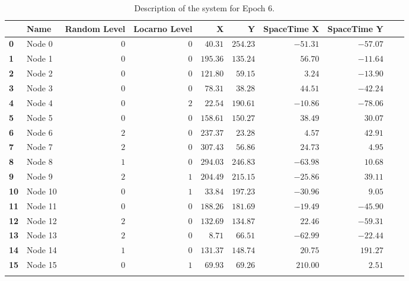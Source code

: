 \documentclass[a4paper,11pt,twoside=semi,openright]{report}
\begin{document}
\begin{table}[h]
\centering
\tiny
\begin{tabular}{@{}llrrrrrrll@{}}
\toprule
& \textbf{Name}   &\textbf{Random Level} &\textbf{Locarno Level} & \textbf{X} & \textbf{Y} & \textbf{SpaceTime X} & \textbf{SpaceTime Y}  \\ \midrule
\textbf{0} & Node 0&$0$&$0$&$40.31$&$254.23$&$-51.31$&$-57.07$&\\ \hdashline
\textbf{1} & Node 1&$0$&$0$&$195.36$&$135.24$&$56.70$&$-11.64$&\\ \hdashline
\textbf{2} & Node 2&$0$&$0$&$121.80$&$59.15$&$3.24$&$-13.90$&\\ \hdashline
\textbf{3} & Node 3&$0$&$0$&$78.31$&$38.28$&$44.51$&$-42.24$&\\ \hdashline
\textbf{4} & Node 4&$0$&$2$&$22.54$&$190.61$&$-10.86$&$-78.06$&\\ \hdashline
\textbf{5} & Node 5&$0$&$0$&$158.61$&$150.27$&$38.49$&$30.07$&\\ \hdashline
\textbf{6} & Node 6&$2$&$0$&$237.37$&$23.28$&$4.57$&$42.91$&\\ \hdashline
\textbf{7} & Node 7&$2$&$0$&$307.43$&$56.86$&$24.73$&$4.95$&\\ \hdashline
\textbf{8} & Node 8&$1$&$0$&$294.03$&$246.83$&$-63.98$&$10.68$&\\ \hdashline
\textbf{9} & Node 9&$2$&$1$&$204.49$&$215.15$&$-25.86$&$39.11$&\\ \hdashline
\textbf{10} & Node 10&$0$&$1$&$33.84$&$197.23$&$-30.96$&$9.05$&\\ \hdashline
\textbf{11} & Node 11&$0$&$0$&$188.26$&$181.69$&$-19.49$&$-45.90$&\\ \hdashline
\textbf{12} & Node 12&$2$&$0$&$132.69$&$134.87$&$22.46$&$-59.31$&\\ \hdashline
\textbf{13} & Node 13&$2$&$0$&$8.71$&$66.51$&$-62.99$&$-22.44$&\\ \hdashline
\textbf{14} & Node 14&$1$&$0$&$131.37$&$148.74$&$20.75$&$191.27$&\\ \hdashline
\textbf{15} & Node 15&$0$&$1$&$69.93$&$69.26$&$210.00$&$2.51$&\\ \hdashline\midrule
\bottomrule
\end{tabular}
\caption{Description of the system for Epoch 6.}
\end{table}
\end{document}
